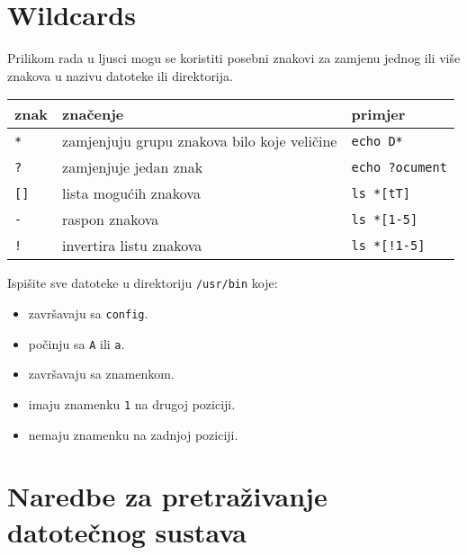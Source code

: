 \section{Wildcards}

Prilikom rada u ljusci mogu se koristiti posebni znakovi za zamjenu jednog ili više znakova u nazivu datoteke ili direktorija.

\begin{center}
\begin{tabular}{lll}
\toprule
znak & značenje & primjer\\


\midrule
\texttt{*} & zamjenjuju grupu znakova bilo koje veličine& \texttt{echo D*}\\
\texttt{?} & zamjenjuje jedan znak&\texttt{echo ?ocument}\\
\texttt{[]} & lista mogućih znakova&\texttt{ls *[tT]}\\ 
\texttt{-} & raspon znakova &\texttt{ls *[1-5]}\\
\texttt{!} &invertira listu znakova&\texttt{ls *[!1-5]}\\
\bottomrule
\end{tabular}
\end{center}
\begin{zadatak} Ispišite sve datoteke u direktoriju \texttt{/usr/bin} koje:
\begin{itemize}
 \item završavaju sa \texttt{config}.
 \item počinju sa \texttt{A} ili \texttt{a}.
 \item završavaju sa znamenkom.
 \item imaju znamenku \texttt{1} na drugoj poziciji.
 \item nemaju znamenku na zadnjoj poziciji.
 \end{itemize}
\end{zadatak}

 \section{Naredbe za pretraživanje datotečnog sustava}
